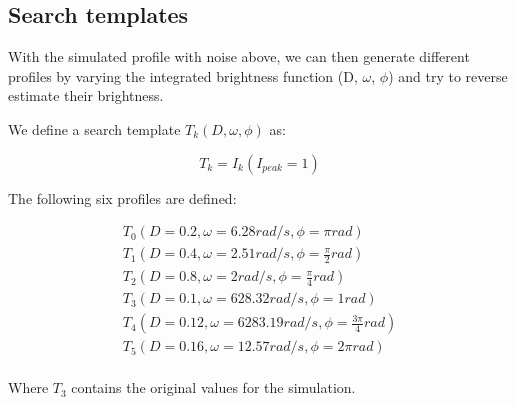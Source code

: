\documentclass{article}
\begin{document}
\subsection{Search templates}

With the simulated profile with noise above, we can then generate different
profiles by varying the integrated brightness function (D, $\omega$, $\phi$) and
try to reverse estimate their brightness.

We define a search template $T_k(D, \omega, \phi)$ as:

\begin{equation}
    T_k = I_k(I_{peak}=1)
\end{equation}

The following six profiles are defined:

\begin{align*}
    T_{0}(D = 0.2, \omega = 6.28 rad/s, \phi = \pi rad)\\
    T_{1}(D = 0.4, \omega = 2.51 rad/s, \phi = \frac{\pi}{2} rad)\\
    T_{2}(D = 0.8, \omega = 2 rad/s, \phi = \frac{\pi}{4} rad)\\
    T_{3}(D = 0.1, \omega = 628.32 rad/s, \phi = 1 rad)\\
    T_{4}(D = 0.12, \omega = 6283.19 rad/s, \phi = \frac{3 \pi}{4} rad)\\
    T_{5}(D = 0.16, \omega = 12.57 rad/s, \phi = 2 \pi rad)\\
\end{align*}

Where $T_{3}$ contains the original values for the simulation.
\end{document}
